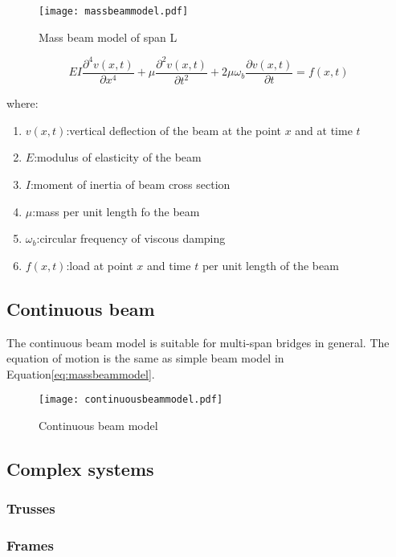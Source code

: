 \begin{figure}[h]
	\centering
	\texttt{[image: massbeammodel.pdf]}
	\caption{Mass beam model of span L}
	\label{fig:massbeammodel}
\end{figure}

\begin{equation}
	EI\dfrac{\partial^4v(x,t)}{\partial x^4}+\mu \dfrac{\partial^2 v(x,t)}{\partial t^2} + 2\mu \omega_b \dfrac{\partial v(x,t)}{\partial t} = f(x,t)
	\label{eq:massbeammodel}
\end{equation}

where:
\begin{enumerate}[]
	\item $ v(x,t) $:vertical deflection of the beam at the point $ x $ and at time $ t $
	\item $ E $:modulus of elasticity of the beam
	\item $ I $:moment of inertia of beam cross section
	\item $ \mu $:mass per unit length fo the beam
	\item $ \omega_b $:circular frequency of viscous damping
	\item $ f(x,t) $:load at point $ x $ and time $ t $ per unit length of the beam
\end{enumerate}

\subsection{Continuous beam}
The continuous beam model is suitable for multi-span bridges in general. The equation of motion is the same as simple beam model in Equation\ref{eq:massbeammodel}. 

\begin{figure}[h]
	\centering
	\texttt{[image: continuousbeammodel.pdf]}
	\caption{Continuous beam model}
	\label{fig:continuousbeammodel}
\end{figure}
	
\subsection{Complex systems}

\subsubsection{Trusses}

\subsubsection{Frames}

